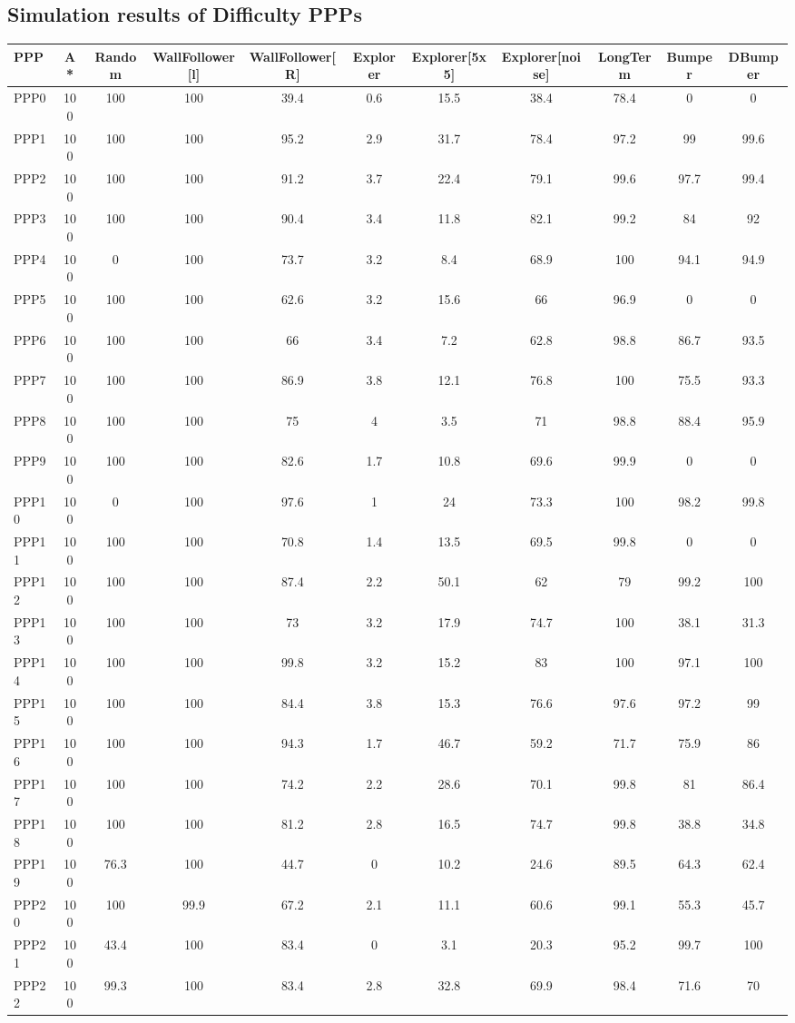 \documentclass[authoryearcitations]{UoYCSproject}
\begin{document}
\begin{appendices}
\section{Simulation results of Difficulty PPPs}
\begin{table}
\begin{tabular}{|l|c|c|c|c|c|c|c|c|c|c}
PPP	& A* & Random & WallFollower[l] & WallFollower[R] & Explorer& Explorer[5x5] & Explorer[noise] & LongTerm & Bumper & DBumper \\
\hline
PPP0&100&100&100&39.4&0.6&15.5&38.4&78.4&0&0\\
PPP1&100&100&100&95.2&2.9&31.7&78.4&97.2&99&99.6\\
PPP2&100&100&100&91.2&3.7&22.4&79.1&99.6&97.7&99.4\\
PPP3&100&100&100&90.4&3.4&11.8&82.1&99.2&84&92\\
PPP4&100&0&100&73.7&3.2&8.4&68.9&100&94.1&94.9\\
PPP5&100&100&100&62.6&3.2&15.6&66&96.9&0&0\\
PPP6&100&100&100&66&3.4&7.2&62.8&98.8&86.7&93.5\\
PPP7&100&100&100&86.9&3.8&12.1&76.8&100&75.5&93.3\\
PPP8&100&100&100&75&4&3.5&71&98.8&88.4&95.9\\
PPP9&100&100&100&82.6&1.7&10.8&69.6&99.9&0&0\\
PPP10&100&0&100&97.6&1&24&73.3&100&98.2&99.8\\
PPP11&100&100&100&70.8&1.4&13.5&69.5&99.8&0&0\\
PPP12&100&100&100&87.4&2.2&50.1&62&79&99.2&100\\
PPP13&100&100&100&73&3.2&17.9&74.7&100&38.1&31.3\\
PPP14&100&100&100&99.8&3.2&15.2&83&100&97.1&100\\
PPP15&100&100&100&84.4&3.8&15.3&76.6&97.6&97.2&99\\
PPP16&100&100&100&94.3&1.7&46.7&59.2&71.7&75.9&86\\
PPP17&100&100&100&74.2&2.2&28.6&70.1&99.8&81&86.4\\
PPP18&100&100&100&81.2&2.8&16.5&74.7&99.8&38.8&34.8\\
PPP19&100&76.3&100&44.7&0&10.2&24.6&89.5&64.3&62.4\\
PPP20&100&100&99.9&67.2&2.1&11.1&60.6&99.1&55.3&45.7\\
PPP21&100&43.4&100&83.4&0&3.1&20.3&95.2&99.7&100\\
PPP22&100&99.3&100&83.4&2.8&32.8&69.9&98.4&71.6&70\\

\end{tabular}
\end{table}
\end{appendices}
\end{document}

